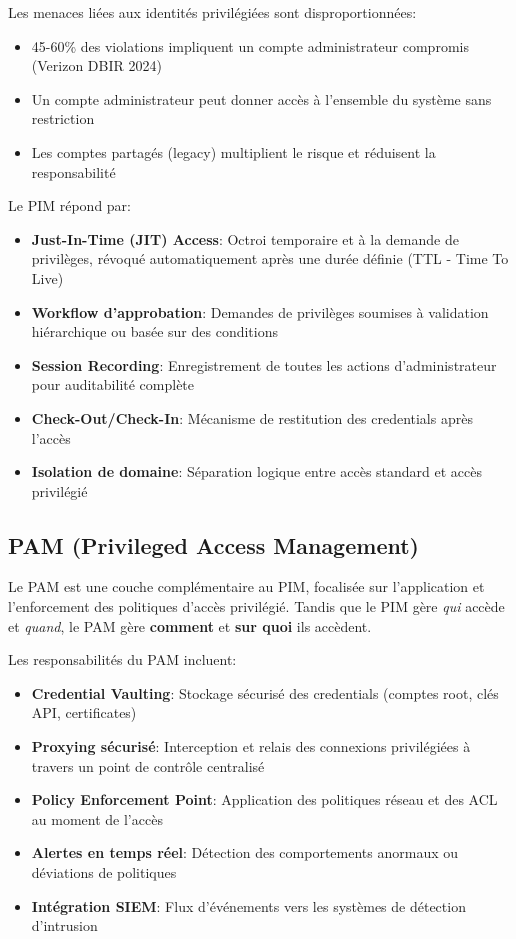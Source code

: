 Les menaces liées aux identités privilégiées sont disproportionnées:
\begin{itemize}
    \item 45-60\% des violations impliquent un compte administrateur compromis (Verizon DBIR 2024)
    \item Un compte administrateur peut donner accès à l'ensemble du système sans restriction
    \item Les comptes partagés (legacy) multiplient le risque et réduisent la responsabilité
\end{itemize}

Le PIM répond par:
\begin{itemize}
    \item \textbf{Just-In-Time (JIT) Access}: Octroi temporaire et à la demande de privilèges, révoqué automatiquement après une durée définie (TTL - Time To Live)
    \item \textbf{Workflow d'approbation}: Demandes de privilèges soumises à validation hiérarchique ou basée sur des conditions
    \item \textbf{Session Recording}: Enregistrement de toutes les actions d'administrateur pour auditabilité complète
    \item \textbf{Check-Out/Check-In}: Mécanisme de restitution des credentials après l'accès
    \item \textbf{Isolation de domaine}: Séparation logique entre accès standard et accès privilégié
\end{itemize}

\subsection{PAM (Privileged Access Management)}

Le PAM est une couche complémentaire au PIM, focalisée sur l'application et l'enforcement des politiques d'accès privilégié. Tandis que le PIM gère \textit{qui} accède et \textit{quand}, le PAM gère \textbf{comment} et \textbf{sur quoi} ils accèdent.

Les responsabilités du PAM incluent:
\begin{itemize}
    \item \textbf{Credential Vaulting}: Stockage sécurisé des credentials (comptes root, clés API, certificates)
    \item \textbf{Proxying sécurisé}: Interception et relais des connexions privilégiées à travers un point de contrôle centralisé
    \item \textbf{Policy Enforcement Point}: Application des politiques réseau et des ACL au moment de l'accès
    \item \textbf{Alertes en temps réel}: Détection des comportements anormaux ou déviations de politiques
    \item \textbf{Intégration SIEM}: Flux d'événements vers les systèmes de détection d'intrusion
\end{itemize}

